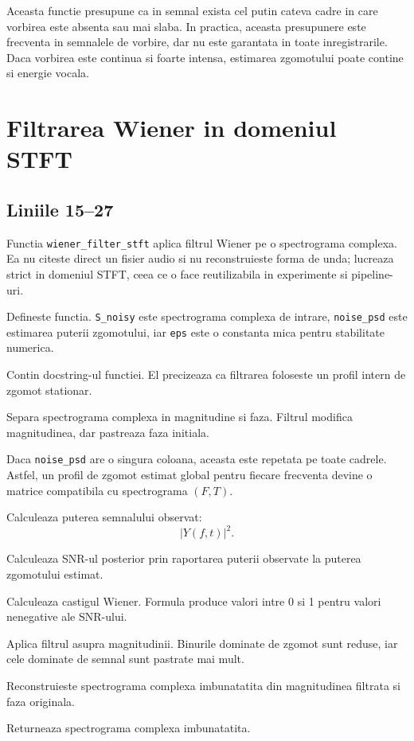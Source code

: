 \documentclass[12pt,a4paper]{report}
\newcommand{\codechunk}[2]{
    
}
\begin{document}
Aceasta functie presupune ca in semnal exista cel putin cateva cadre in care vorbirea este absenta sau mai slaba. In practica, aceasta presupunere este frecventa in semnalele de vorbire, dar nu este garantata in toate inregistrarile. Daca vorbirea este continua si foarte intensa, estimarea zgomotului poate contine si energie vocala.

\chapter{Filtrarea Wiener in domeniul STFT}

\section{Liniile 15--27}

\codechunk{15}{27}

Functia \texttt{wiener\_filter\_stft} aplica filtrul Wiener pe o spectrograma complexa. Ea nu citeste direct un fisier audio si nu reconstruieste forma de unda; lucreaza strict in domeniul STFT, ceea ce o face reutilizabila in experimente si pipeline-uri.

\begin{description}[leftmargin=2.8cm,style=nextline]
    \item[Linia 15] Defineste functia. \texttt{S\_noisy} este spectrograma complexa de intrare, \texttt{noise\_psd} este estimarea puterii zgomotului, iar \texttt{eps} este o constanta mica pentru stabilitate numerica.
    \item[Liniile 16--18] Contin docstring-ul functiei. El precizeaza ca filtrarea foloseste un profil intern de zgomot stationar.
    \item[Linia 19] Separa spectrograma complexa in magnitudine si faza. Filtrul modifica magnitudinea, dar pastreaza faza initiala.
    \item[Liniile 20--21] Daca \texttt{noise\_psd} are o singura coloana, aceasta este repetata pe toate cadrele. Astfel, un profil de zgomot estimat global pentru fiecare frecventa devine o matrice compatibila cu spectrograma \((F,T)\).
    \item[Linia 22] Calculeaza puterea semnalului observat:
    \[
    |Y(f,t)|^2.
    \]
    \item[Linia 23] Calculeaza SNR-ul posterior prin raportarea puterii observate la puterea zgomotului estimat.
    \item[Linia 24] Calculeaza castigul Wiener. Formula produce valori intre 0 si 1 pentru valori nenegative ale SNR-ului.
    \item[Linia 25] Aplica filtrul asupra magnitudinii. Binurile dominate de zgomot sunt reduse, iar cele dominate de semnal sunt pastrate mai mult.
    \item[Linia 26] Reconstruieste spectrograma complexa imbunatatita din magnitudinea filtrata si faza originala.
    \item[Linia 27] Returneaza spectrograma complexa imbunatatita.
\end{description}
\end{document}
